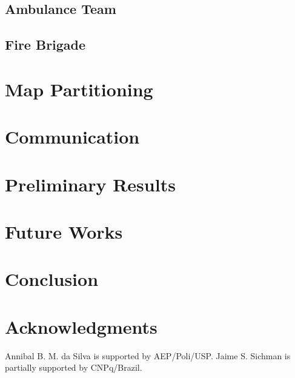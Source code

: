 \documentclass{llncs}
\begin{document}
\subsection{Ambulance Team}
	\label{subsec:ambulanceTeam}
	

\subsection{Fire Brigade}
	\label{subsec:fireBrigade}
	

\section{Map Partitioning}
	\label{sec:partitioning}
	

\section{Communication}
	\label{sec:communication}
	

\section{Preliminary Results}
	\label{sec:preResults}
	
	
\section{Future Works}
	\label{sec:future}
	

\section{Conclusion}
	\label{sec:conclusion}
	

\section*{Acknowledgments}
\label{sec:acknowledgments}
Annibal B. M. da Silva is supported by AEP/Poli/USP. Jaime S. Sichman is partially supported by CNPq/Brazil.


\end{document}
